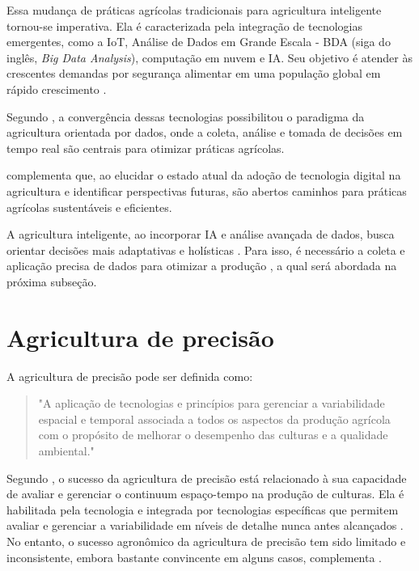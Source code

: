 Essa mudança de práticas agrícolas tradicionais para agricultura inteligente tornou-se imperativa. Ela é caracterizada pela integração de tecnologias emergentes, como a IoT, Análise de Dados em Grande Escala - BDA (siga do inglês, \textit{Big Data Analysis}), computação em nuvem e IA. Seu objetivo é atender às crescentes demandas por segurança alimentar em uma população global em rápido crescimento \parencite{Gurjeet_smart2022, Garg_smart2023}.

Segundo \textcite{Garg_smart2023}, a convergência dessas tecnologias possibilitou o paradigma da agricultura orientada por dados, onde a coleta, análise e tomada de decisões em tempo real são centrais para otimizar práticas agrícolas.

\textcite{Gurjeet_smart2022} complementa que, ao elucidar o estado atual da adoção de tecnologia digital na agricultura e identificar perspectivas futuras, são abertos caminhos para práticas agrícolas sustentáveis e eficientes.

A agricultura inteligente, ao incorporar IA e análise avançada de dados, busca orientar decisões mais adaptativas e holísticas \parencite{Garg_smart2023}. Para isso, é necessário a coleta e aplicação precisa de dados para otimizar a produção \parencite{Lamine_precision2024}, a qual será abordada na próxima subseção.

\section{Agricultura de precisão}

A agricultura de precisão pode ser definida como: 

\begin{quote}
  "A aplicação de tecnologias e princípios para gerenciar a variabilidade espacial e temporal associada a todos os aspectos da produção agrícola com o propósito de melhorar o desempenho das culturas e a qualidade ambiental." \parencite[{p. 1}]{Pierce_precision1999}
\end{quote}

Segundo \textcite{Pierce_precision1999}, o sucesso da agricultura de precisão está relacionado à sua capacidade de avaliar e gerenciar o continuum espaço-tempo na produção de culturas. Ela é habilitada pela tecnologia e integrada por tecnologias específicas que permitem avaliar e gerenciar a variabilidade em níveis de detalhe nunca antes alcançados \parencite{Zhang_precision2002}. No entanto, o sucesso agronômico da agricultura de precisão tem sido limitado e inconsistente, embora bastante convincente em alguns casos, complementa \textcite{Zhang_precision2002}.

